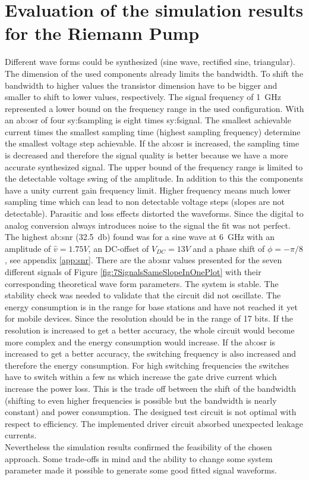 \section{Evaluation of the simulation results for the Riemann Pump}
Different wave forms could be synthesized (sine wave, rectified sine, triangular).
The dimension of the used components already limits the bandwidth.
To shift the bandwidth to higher values the transistor dimension have to be bigger and smaller to shift to lower values, respectively.
The signal frequency of \SI{1}{\giga \hertz} represented a lower bound on the frequency range in the used configuration.
With an \gls{ab:osr} of four \gls{sy:fsampling} is eight times \gls{sy:fsignal}.
The smallest achievable current times the smallest sampling time (highest sampling frequency) determine the smallest voltage step achievable.
If the \gls{ab:osr} is increased, the sampling time is decreased and therefore the signal quality is better because we have a more accurate synthesized signal. 
The upper bound of the frequency range is limited to the detectable voltage swing of the amplitude.
In addition to this the components have a unity current gain frequency limit.
Higher frequency means much lower sampling time which can lead to non detectable voltage steps (slopes are not detectable).
Parasitic and loss effects distorted the waveforms.
Since the digital to analog conversion always introduces noise to the signal the fit was not perfect.
The highest \gls{ab:snr} (\SI{32.5}{\decibel}) found was for a sine wave at \SI{6}{\giga \hertz} with an amplitude of $\hat{v} = 1.75 V$, an DC-offset of $V_{DC} = 13 V$ and a phase shift of $\phi = -\pi/8$, see appendix \ref{app:snr}.
There are the \gls{ab:snr} values presented for the seven different signals of Figure \ref{fig:7SignalsSameSlopeInOnePlot} with their corresponding theoretical wave form parameters.
The system is stable.
The stability check was needed to validate that the circuit did not oscillate.
The energy consumption is in the range for base stations and have not reached it yet for mobile devices.
Since the resolution should be in the range of 17 bits.
If the resolution is increased to get a better accuracy, the whole circuit would become more complex and the energy consumption would increase.
If the \gls{ab:osr} is increased to get a better accuracy, the switching frequency is also increased and therefore the energy consumption.
For high switching frequencies the switches have to switch within a few \si{\nano \second} which increase the gate drive current which increase the power loss.
This is the trade off between the shift of the bandwidth (shifting to even higher frequencies is possible but the bandwidth is nearly constant) and power consumption.
The designed test circuit is not optimal with respect to efficiency.
The implemented driver circuit absorbed unexpected leakage currents.\\
Nevertheless the simulation results confirmed the feasibility of the chosen approach.
Some trade-offs in mind and the ability to change some system parameter made it possible to generate some good fitted signal waveforms.